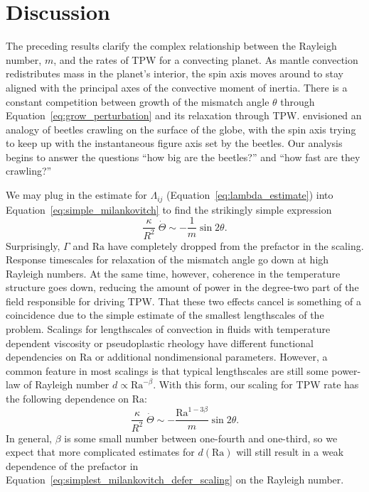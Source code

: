 \documentclass[preprint,12pt,authoryear]{elsarticle}
\begin{document}
\section{Discussion}
\label{sec:discussion}

The preceding results clarify the complex relationship between the Rayleigh number, $m$, and the rates of TPW for a convecting planet.
As mantle convection redistributes mass in the planet's interior, the spin axis moves around to stay aligned with the principal axes of the convective moment of inertia. 
There is a constant competition between growth of the mismatch angle $\theta$ through 
Equation~\eqref{eq:grow_perturbation} and its relaxation through TPW.
\citet{goldreich1969some} envisioned an analogy of beetles crawling on the surface of the globe, with
the spin axis trying to keep up with the instantaneous figure axis set by the beetles.
Our analysis begins to answer the questions ``how big are the beetles?'' and ``how fast are they crawling?''

We may plug in the estimate for $\Lambda_{ij}$ (Equation~\eqref{eq:lambda_estimate}) into Equation~\eqref{eq:simple_milankovitch} to find the strikingly simple expression
\begin{equation}
\frac{\kappa}{R^2} \; \dot{\Theta} \sim -\frac{1}{m} \sin{2 \theta}.
\label{eq:simplest_milankovitch}
\end{equation}
Surprisingly, $\Gamma$ and $\mathrm{Ra}$ have completely dropped from the prefactor in the scaling. 
Response timescales for relaxation of the mismatch angle go down at high Rayleigh numbers.
At the same time, however, coherence in the temperature structure goes down, reducing the amount of power in the degree-two part of the field responsible for driving TPW.
That these two effects cancel is something of a coincidence due to the simple estimate of the smallest lengthscales of the problem.
Scalings for lengthscales of convection in fluids with temperature dependent viscosity \citep[e.g.][]{solomatov1995scaling} or pseudoplastic rheology \citep[e.g.][]{korenaga2010scaling} have different functional dependencies on $\mathrm{Ra}$ or additional nondimensional parameters.
However, a common feature in most scalings is that typical lengthscales are still some power-law of Rayleigh number $d \propto \mathrm{Ra}^{-\beta}$.
With this form, our scaling for TPW rate has the following dependence on $\mathrm{Ra}$:
\begin{equation}
\frac{\kappa}{R^2} \; \dot{\Theta} \sim -\frac{\mathrm{Ra}^{1-3\beta}}{m} \sin{2 \theta}.
\label{eq:simplest_milankovitch_defer_scaling}
\end{equation}
In general, $\beta$ is some small number between one-fourth and one-third, so we expect that more complicated estimates for 
$d(\mathrm{Ra})$ will still result in a weak dependence of the prefactor in Equation~\eqref{eq:simplest_milankovitch_defer_scaling} 
on the Rayleigh number.
\end{document}
